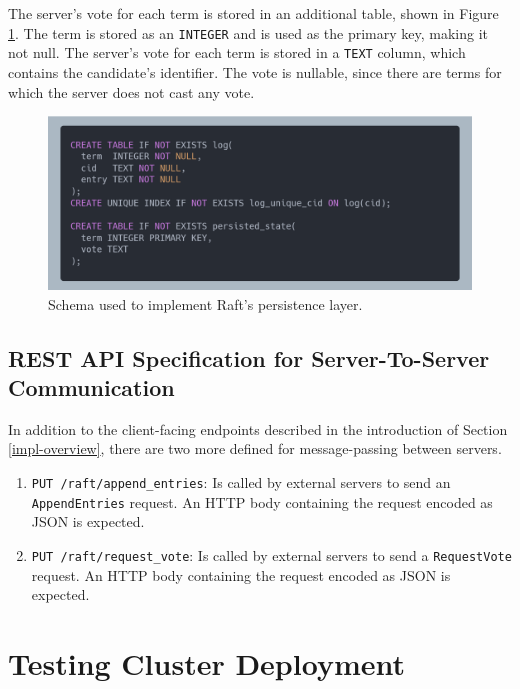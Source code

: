 The server's vote for each term is stored in an additional table, shown in Figure \ref{fig:sqlite-schema}. The term is stored as an \lstinline|INTEGER| and is used as the primary key, making it not null. The server's vote for each term is stored in a \lstinline|TEXT| column, which contains the candidate's identifier. The vote is nullable, since there are terms for which the server does not cast any vote.

\begin{figure}[ht]
  \centering
  \includegraphics[width=400pt]{images/sqlite-schema.png}
  \caption{Schema used to implement Raft's persistence layer.}
  \label{fig:sqlite-schema}
\end{figure}

\subsection{REST API Specification for Server-To-Server Communication} \label{rpc-endpoints}

In addition to the client-facing endpoints described in the introduction of Section \ref{impl-overview}, there are two more defined for message-passing between servers.
\begin{enumerate}
    \item \lstinline|PUT /raft/append_entries|: Is called by external servers to send an \lstinline|AppendEntries| request. An HTTP body containing the request encoded as JSON is expected. 
    \item \lstinline|PUT /raft/request_vote|: Is called by external servers to send a \lstinline|RequestVote| request. An HTTP body containing the request encoded as JSON is expected.
\end{enumerate}

\section{Testing Cluster Deployment} \label{testing-cluster-deployment}


